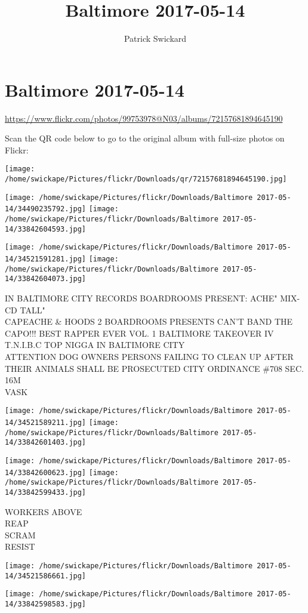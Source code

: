 \documentclass[10pt,letterpaper]{article}
\title{Baltimore 2017-05-14}
\author{Patrick Swickard}
\date{}
\begin{document}
\section*{Baltimore 2017-05-14}

\url{https://www.flickr.com/photos/99753978@N03/albums/72157681894645190}

Scan the QR code below to go to the original album with full-size photos on Flickr:

\texttt{[image: /home/swickape/Pictures/flickr/Downloads/qr/72157681894645190.jpg]}
\pagebreak

\texttt{[image: /home/swickape/Pictures/flickr/Downloads/Baltimore 2017-05-14/34490235792.jpg]}
\texttt{[image: /home/swickape/Pictures/flickr/Downloads/Baltimore 2017-05-14/33842604593.jpg]}

\texttt{[image: /home/swickape/Pictures/flickr/Downloads/Baltimore 2017-05-14/34521591281.jpg]}
\texttt{[image: /home/swickape/Pictures/flickr/Downloads/Baltimore 2017-05-14/33842604073.jpg]}

IN BALTIMORE CITY RECORDS BOARDROOMS PRESENT: ACHE" MIX{-}CD TALL"\\
CAPEACHE \& HOODS 2 BOARDROOMS PRESENTS CAN'T BAND THE CAPO!!! BEST RAPPER EVER VOL. 1 BALTIMORE TAKEOVER IV T.N.I.B.C TOP NIGGA IN BALTIMORE CITY\\
ATTENTION DOG OWNERS PERSONS FAILING TO CLEAN UP AFTER THEIR ANIMALS SHALL BE PROSECUTED CITY ORDINANCE \#708 SEC. 16M\\
VASK
\pagebreak

\texttt{[image: /home/swickape/Pictures/flickr/Downloads/Baltimore 2017-05-14/34521589211.jpg]}
\texttt{[image: /home/swickape/Pictures/flickr/Downloads/Baltimore 2017-05-14/33842601403.jpg]}

\texttt{[image: /home/swickape/Pictures/flickr/Downloads/Baltimore 2017-05-14/33842600623.jpg]}
\texttt{[image: /home/swickape/Pictures/flickr/Downloads/Baltimore 2017-05-14/33842599433.jpg]}

WORKERS ABOVE\\
REAP\\
SCRAM\\
RESIST
\pagebreak

\texttt{[image: /home/swickape/Pictures/flickr/Downloads/Baltimore 2017-05-14/34521586661.jpg]}

\vspace{0.25in}
\texttt{[image: /home/swickape/Pictures/flickr/Downloads/Baltimore 2017-05-14/33842598583.jpg]}
\end{document}

